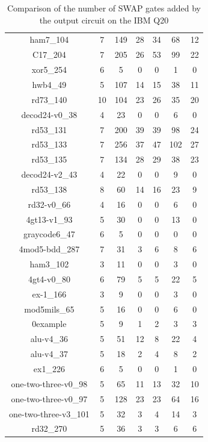 \documentclass[runningheads]{llncs}
\begin{document}
\begin{table}[H]
\begin{center}
\begin{tabular}{|c|c|c|c|c|c|c|}
ham7\_104 & 7 & 149 & 28 & 34 & 68 & 12 \\ 
C17\_204 & 7 & 205 & 26 & 53 & 99 & 22 \\ 
xor5\_254 & 6 & 5 & 0 & 0 & 1 & 0 \\ 
hwb4\_49 & 5 & 107 & 14 & 15 & 38 & 11 \\ 
rd73\_140 & 10 & 104 & 23 & 26 & 35 & 20 \\ 
decod24-v0\_38 & 4 & 23 & 0 & 0 & 6 & 0 \\ 
rd53\_131 & 7 & 200 & 39 & 39 & 98 & 24 \\ 
rd53\_133 & 7 & 256 & 37 & 47 & 102 & 27 \\ 
rd53\_135 & 7 & 134 & 28 & 29 & 38 & 23 \\ 
decod24-v2\_43 & 4 & 22 & 0 & 0 & 9 & 0 \\ 
rd53\_138 & 8 & 60 & 14 & 16 & 23 & 9 \\ 
rd32-v0\_66 & 4 & 16 & 0 & 0 & 6 & 0 \\ 
4gt13-v1\_93 & 5 & 30 & 0 & 0 & 13 & 0 \\ 
graycode6\_47 & 6 & 5 & 0 & 0 & 0 & 0 \\ 
4mod5-bdd\_287 & 7 & 31 & 3 & 6 & 8 & 6 \\ 
ham3\_102 & 3 & 11 & 0 & 0 & 3 & 0 \\ 
4gt4-v0\_80 & 6 & 79 & 5 & 5 & 22 & 5 \\ 
ex-1\_166 & 3 & 9 & 0 & 0 & 3 & 0 \\ 
mod5mils\_65 & 5 & 16 & 0 & 0 & 6 & 0 \\ 
0example & 5 & 9 & 1 & 2 & 3 & 3 \\ 
alu-v4\_36 & 5 & 51 & 12 & 8 & 22 & 4 \\ 
alu-v4\_37 & 5 & 18 & 2 & 4 & 8 & 2 \\ 
ex1\_226 & 6 & 5 & 0 & 0 & 1 & 0 \\ 
one-two-three-v0\_98 & 5 & 65 & 11 & 13 & 32 & 10 \\ 
one-two-three-v0\_97 & 5 & 128 & 23 & 23 & 64 & 16 \\ 
one-two-three-v3\_101 & 5 & 32 & 3 & 4 & 14 & 3 \\ 
rd32\_270 & 5 & 36 & 3 & 3 & 6 & 6 \\
\hline
	\end{tabular} 
	\end{center}
	\caption{Comparison of  the number of  SWAP gates added by the 
	output circuit on the IBM Q20 } 
	\label{tab2}
	\end{table}
\end{document}

